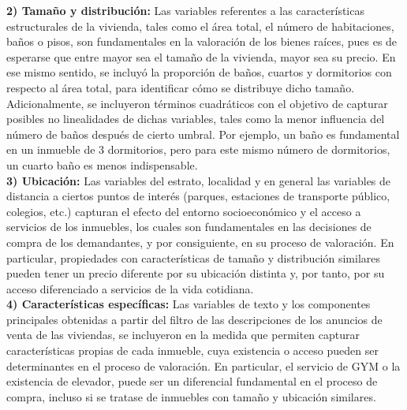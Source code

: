 \documentclass[a4paper]{article}
\theoremstyle{remark}
\theoremstyle{definition}
\begin{document}
\textbf{2) Tamaño y distribución:} Las variables referentes a las características estructurales de la vivienda, tales como el área total, el número de habitaciones, baños o pisos, son fundamentales en la valoración de los bienes raíces, pues es de esperarse que entre mayor sea el tamaño de la vivienda, mayor sea  su precio. En ese mismo sentido, se incluyó la proporción de baños, cuartos y dormitorios con respecto al área total, para identificar cómo se distribuye dicho tamaño. Adicionalmente, se incluyeron términos cuadráticos con el objetivo de capturar posibles no linealidades de dichas variables, tales como la menor influencia del número de baños después de cierto umbral. Por ejemplo, un baño es fundamental en un inmueble de 3 dormitorios, pero para este mismo número de dormitorios, un cuarto baño es menos indispensable. \\

\textbf{3) Ubicación:} Las variables del estrato, localidad y en general las variables de distancia a ciertos puntos de interés (parques, estaciones de transporte público, colegios, etc.) capturan el efecto del entorno socioeconómico y el acceso a servicios de los inmuebles, los cuales son fundamentales en las decisiones de compra de los demandantes, y por consiguiente, en su proceso de valoración. En particular, propiedades con características de tamaño y distribución similares pueden tener un precio diferente por su ubicación distinta y, por tanto, por su acceso diferenciado a servicios de la vida cotidiana. \\

\textbf{4) Características específicas:} Las variables de texto y los componentes principales obtenidas a partir del filtro de las descripciones de los anuncios de venta de las viviendas, se incluyeron en la medida que permiten capturar características propias de cada inmueble, cuya existencia o acceso pueden ser determinantes en el proceso de valoración. En particular, el servicio de GYM o la existencia de elevador, puede ser un diferencial fundamental en el proceso de compra, incluso si se tratase de inmuebles con tamaño y ubicación similares.  \\
\end{document}
